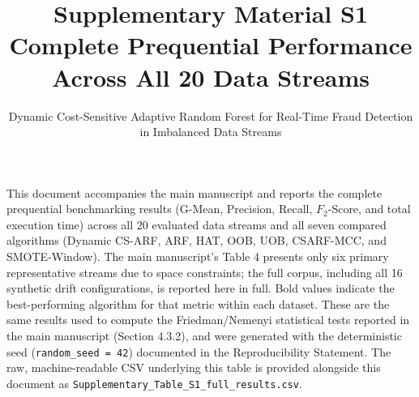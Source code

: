 \documentclass[10pt]{article}
\title{Supplementary Material S1\\
\large Complete Prequential Performance Across All 20 Data Streams}
\author{Dynamic Cost-Sensitive Adaptive Random Forest for Real-Time Fraud Detection\\
in Imbalanced Data Streams}
\date{}
\begin{document}
\maketitle

This document accompanies the main manuscript and reports the complete prequential
benchmarking results (G-Mean, Precision, Recall, $F_2$-Score, and total execution time)
across all 20 evaluated data streams and all seven compared algorithms (Dynamic CS-ARF,
ARF, HAT, OOB, UOB, CSARF-MCC, and SMOTE-Window). The main manuscript's Table 4 presents
only six primary representative streams due to space constraints; the full corpus,
including all 16 synthetic drift configurations, is reported here in full. Bold values
indicate the best-performing algorithm for that metric within each dataset. These are the
same results used to compute the Friedman/Nemenyi statistical tests reported in the main
manuscript (Section 4.3.2), and were generated with the deterministic seed
(\texttt{random\_seed = 42}) documented in the Reproducibility Statement. The raw,
machine-readable CSV underlying this table is provided alongside this document as
\texttt{Supplementary\_Table\_S1\_full\_results.csv}.


\end{document}
